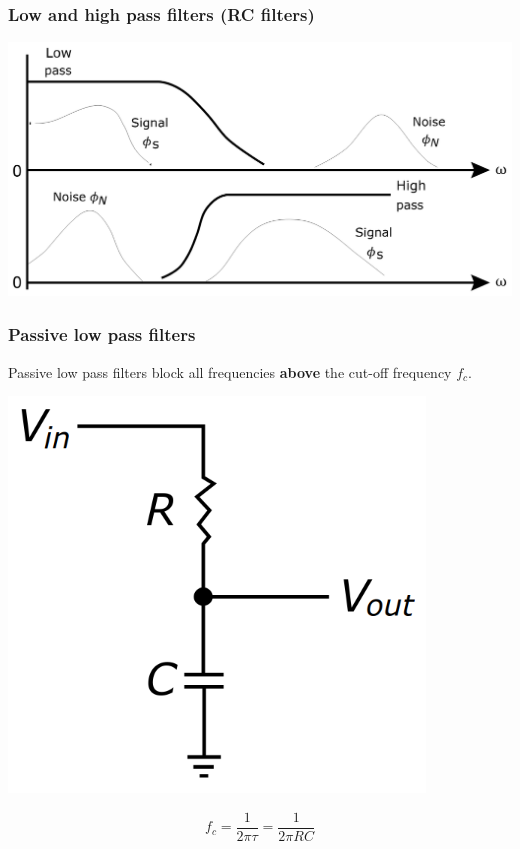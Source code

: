 \documentclass[11pt]{article}
\begin{document}
\subsubsection{Low and high pass filters (RC filters)}
\label{sec:orgfef47f5}
\begin{center}
\includegraphics[width=.9\linewidth]{./images/low-and-high-pass-filters.png}
\end{center}

 \newpage

\subsubsection{Passive low pass filters}
\label{sec:org81f6c09}
Passive low pass filters block all frequencies \textbf{above} the cut-off frequency \(f_c\).
\begin{center}
\includegraphics[width=.9\linewidth]{./images/passive-low-pass-filter.png}
\end{center}
\[f_c = \frac{1}{2 \pi \tau} = \frac{1}{2 \pi RC}\]
\end{document}
